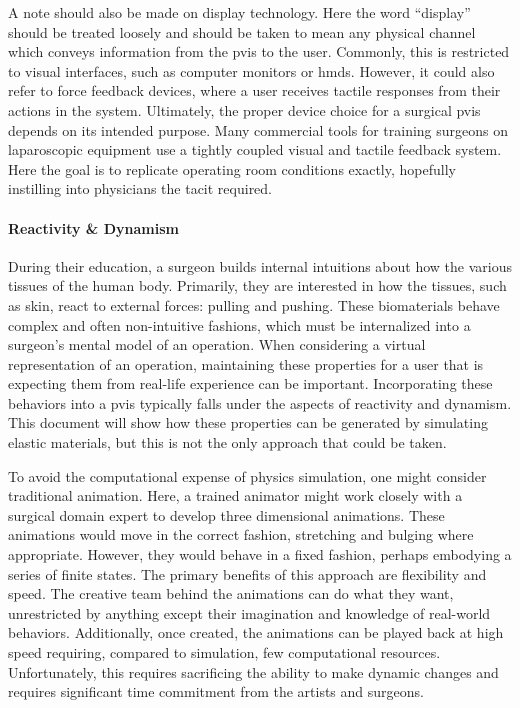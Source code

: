 A note should also be made on display technology. Here the word
``display'' should be treated loosely and should be taken to mean any
physical channel which conveys information from the \gls{pvis} to the
user. Commonly, this is restricted to visual interfaces, such as
computer monitors or \glspl{hmd}. However, it could also refer to
force feedback devices, where a user receives tactile responses from
their actions in the system. Ultimately, the proper device choice for
a surgical \gls{pvis} depends on its intended purpose. Many commercial
tools for training surgeons on laparoscopic equipment use a tightly
coupled visual and tactile feedback system. Here the goal is to
replicate operating room conditions exactly, hopefully instilling into
physicians the \gls{tacit} required.

\paragraph{Reactivity \& Dynamism} During their education, a surgeon
builds internal intuitions about how the various tissues of the human
body. Primarily, they are interested in how the tissues, such as skin,
react to external forces: pulling and pushing. These biomaterials
behave complex and often non-intuitive fashions, which must be
internalized into a surgeon's mental model of an operation. When
considering a virtual representation of an operation, maintaining
these properties for a user that is expecting them from real-life
experience can be important. Incorporating these behaviors into a
\gls{pvis} typically falls under the aspects of reactivity and
dynamism. This document will show how these properties can be
generated by simulating elastic materials, but this is not the only
approach that could be taken.

To avoid the computational expense of physics simulation, one might
consider traditional animation. Here, a trained animator might work
closely with a surgical domain expert to develop three dimensional
animations. These animations would move in the correct fashion,
stretching and bulging where appropriate. However, they would behave
in a fixed fashion, perhaps embodying a series of finite states. The
primary benefits of this approach are flexibility and speed. The
creative team behind the animations can do what they want,
unrestricted by anything except their imagination and knowledge of
real-world behaviors. Additionally, once created, the animations can
be played back at high speed requiring, compared to simulation, few
computational resources. Unfortunately, this requires sacrificing the
ability to make dynamic changes and requires significant time
commitment from the artists and surgeons.

